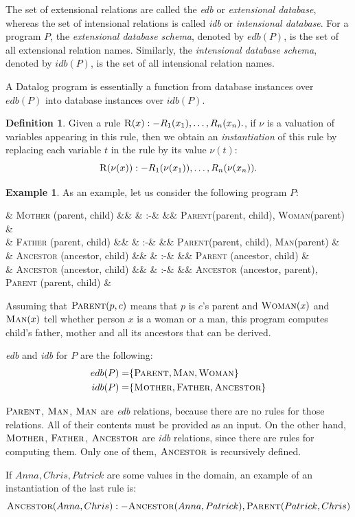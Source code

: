 \documentclass{pracamgr}
\theoremstyle{plain}
\theoremstyle{definition}
\newtheorem{defn}{Definition}[section]
\newtheorem{exmp}{Example}[section]
\theoremstyle{remark}
\newcommand{\assign}{:-}
\newcommand{\narrow}[1]{\begin{changemargin}{2cm}{2cm} #1 \end{changemargin}}
\newcommand{\relat}[2]{$\textsc{#1}#2$}
\newcommand{\rdprog}[2]{
  \narrow{
      #1
      \begin{flalign*}
      #2
      \end{flalign*}
    }
}
\begin{document}
The set of extensional relations are called the \emph{edb} or \emph{extensional database}, whereas the set of intensional relations is called \emph{idb} or \emph{intensional database}. For a program $P$, the \emph{extensional database schema}, denoted by $edb(P)$, is the set of all extensional relation names. Similarly, the \emph{intensional database schema}, denoted by $idb(P)$, is the set of all intensional relation names. 

A Datalog program is essentially a function from database instances over $edb(P)$ into database instances over $idb(P)$.

\begin{defn}
Given a rule $ \textsc{R}(x) \assign R_1(x_1), \dots, R_n(x_n). $, if $\nu$ is a valuation of variables appearing in this rule, then we obtain an \emph{instantiation} of this rule by replacing each variable $t$ in the rule by its value $\nu(t)$:
$$ \textsc{R}(\nu(x)) \assign R_1(\nu(x_1)), \dots, R_n(\nu(x_n)). $$
\end{defn}

\begin{exmp}
As an example, let us consider the following program $P$:

\rdprog{}{
  & \textsc{Mother} (parent, child) &&  & \assign & && \textsc{Parent}(parent, child), \textsc{Woman}(parent) & \\
  & \textsc{Father} (parent, child) &&  & \assign & && \textsc{Parent}(parent, child), \textsc{Man}(parent) & \\
  & \textsc{Ancestor} (ancestor, child) &&  & \assign & && \textsc{Parent} (ancestor, child) &\\
  & \textsc{Ancestor} (ancestor, child) &&  & \assign & && \textsc{Ancestor} (ancestor, parent), \textsc{Parent} (parent, child) &\\
}{}{}

Assuming that \relat{Parent}{(p, c)} means that $p$ is $c$'s parent and \relat{Woman}{(x)} and \relat{Man}{(x)} tell whether person $x$ is a woman or a man, this program computes child's father, mother and all its ancestors that can be derived.

\emph{edb} and \emph{idb} for $P$ are the following:
\begin{align*}
edb(P) =& \{\textsc{Parent}, \textsc{Man}, \textsc{Woman}\} \\
idb(P) =& \{\textsc{Mother}, \textsc{Father}, \textsc{Ancestor}\}
\end{align*}

\relat{Parent}{}, \relat{Man}{}, \relat{Man}{} are \emph{edb} relations, because there are no rules for those relations. All of their contents must be provided as an input. On the other hand, \relat{Mother}{}, \relat{Father}{}, \relat{Ancestor}{} are \emph{idb} relations, since there are rules for computing them. Only one of them, \relat{Ancestor}{} is recursively defined.

If $Anna, Chris, Patrick$ are some values in the domain, an example of an instantiation of the last rule is:
$$\textsc{Ancestor}(Anna, Chris) \assign \textsc{Ancestor} (Anna, Patrick), \textsc{Parent} (Patrick, Chris)$$
\end{exmp}
\end{document}
